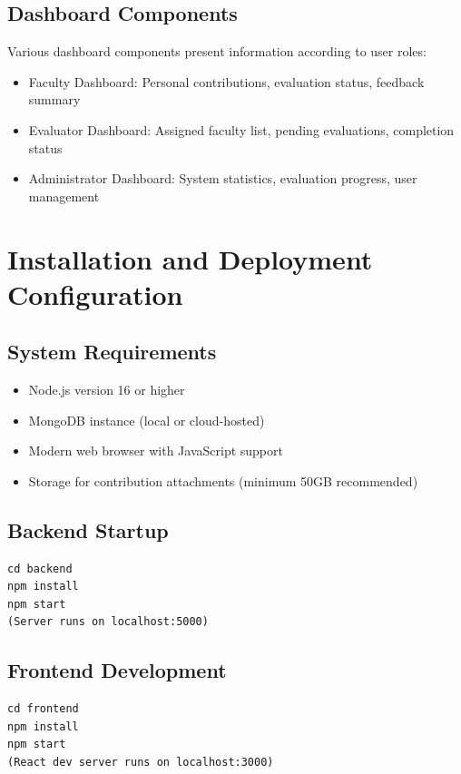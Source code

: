 \documentclass[conference]{IEEEtran}
\begin{document}
\subsection{Dashboard Components}
Various dashboard components present information according to user roles:
\begin{itemize}
\item Faculty Dashboard: Personal contributions, evaluation status, feedback summary
\item Evaluator Dashboard: Assigned faculty list, pending evaluations, completion status
\item Administrator Dashboard: System statistics, evaluation progress, user management
\end{itemize}

\section{Installation and Deployment Configuration}
\label{appx:deployment}

\subsection{System Requirements}
\begin{itemize}
\item Node.js version 16 or higher
\item MongoDB instance (local or cloud-hosted)
\item Modern web browser with JavaScript support
\item Storage for contribution attachments (minimum 50GB recommended)
\end{itemize}

\subsection{Backend Startup}
\begin{verbatim}
cd backend
npm install
npm start
(Server runs on localhost:5000)
\end{verbatim}

\subsection{Frontend Development}
\begin{verbatim}
cd frontend
npm install
npm start
(React dev server runs on localhost:3000)
\end{verbatim}
\end{document}
